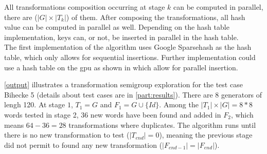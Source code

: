 {All transformations composition occurring at stage $k$ can be computed in parallel, there are ($|G|\times|T_k|$) of them.
After composing the transformations, all hash value can be computed in parallel as well. 
Depending on the hash table implementation, keys can, or not, be inserted in parallel in the hash table.\\
The first implementation of the algorithm uses Google Sparsehash \cite{sparsehash} as the hash table, which only allows for sequential insertions. 
Further implementation could use a hash table on the \gls{gpu} as shown in \cite{wen2011gpu} which allow for parallel insertion.

\autoref{output} illustrates a transformation semigroup exploration for the test case Bihecke 5 (details about test cases are in \autoref{part:results}). 
There are 8 generators of lengh 120. At stage $1$, $T_1=G$ and $F_1=G\cup\{Id\}$. 
Among the $|T_1| \times |G|=8*8$ words tested in stage 2, 36 new words have been found and added in $F_2$, which means $64-36=28$ transformations where duplicates. 
The algorithm runs until there is no new transformation to test ($|T_{end}|=0$), meaning the previous stage did not permit to found any new transformation ($|F_{end-1}|=|F_{end}|$).

}
